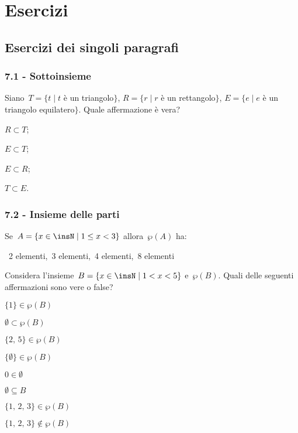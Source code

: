 \section{Esercizi}
\subsection{Esercizi dei singoli paragrafi}
\subsubsection*{7.1 - Sottoinsieme}

\begin{esercizio}
\label{ese:7.1}
 Siano~$T=\{t\mid t$ è un triangolo$\}$, $R=\{r\mid r$ è un rettangolo$\}$,
$E=\{e\mid e$ è un triangolo equilatero$\}$. Quale affermazione è vera?
\begin{multicols}{4}
\begin{enumeratea}
\item $R\subset T$;
\item $E\subset T$;
\item $E\subset R$;
\item $T\subset E$.
\end{enumeratea}
\end{multicols}
\end{esercizio}

\subsubsection*{7.2 - Insieme delle parti}
\begin{esercizio}
\label{ese:7.2}
Se~$A=\{x\in\insN\mid 1\le x<3\}$ allora~$\wp (A)$ ha:
\begin{center}
\boxA\quad~2 elementi,\quad\boxB\quad~3 elementi,\quad\boxC\quad~4 elementi,\quad\boxD\quad~8 elementi
\end{center}
\end{esercizio}

\begin{esercizio}
 \label{ese:7.3}
Considera l'insieme~$B=\{x\in\insN\mid 1<x<5\}$
e~$\wp (B)$. Quali delle seguenti affermazioni sono vere o false?
\begin{multicols}{2}
\TabPositions{4cm}
\begin{enumeratea}
 \item $\{1\}\in\wp (B)$ \tab\boxV\quad\boxF
 \item $\emptyset\subset\wp (B)$ \tab\boxV\quad\boxF
 \item $\{\text{2, 5}\}\in\wp (B)$ \tab\boxV\quad\boxF
 \item $\{\emptyset\}\in\wp (B)$ \tab\boxV\quad\boxF
 \item $0\in\emptyset $ \tab\boxV\quad\boxF
 \item $\emptyset\subseteq B$ \tab\boxV\quad\boxF
 \item $\{\text{1, 2, 3}\}\in\wp (B)$ \tab\boxV\quad\boxF
 \item $\{\text{1, 2, 3}\}\notin\wp (B)$ \tab\boxV\quad\boxF
\end{enumeratea}
\end{multicols}
\end{esercizio}

